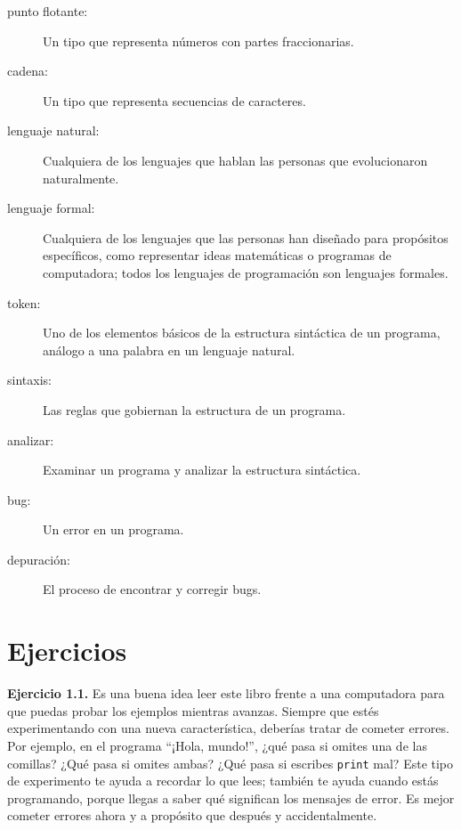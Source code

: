 \documentclass[12pt,letterpaper]{book}
\begin{document}
\begin{description}
\item[punto flotante:] Un tipo que representa números con partes fraccionarias.

\item[cadena:] Un tipo que representa secuencias de caracteres.

\item[lenguaje natural:] Cualquiera de los lenguajes que hablan las personas que evolucionaron naturalmente.

\item[lenguaje formal:] Cualquiera de los lenguajes que las personas han diseñado para propósitos específicos, como representar ideas matemáticas o programas de computadora; todos los lenguajes de programación son lenguajes formales.

\item[token:] Uno de los elementos básicos de la estructura sintáctica de un programa, análogo a una palabra en un lenguaje natural.

\item[sintaxis:] Las reglas que gobiernan la estructura de un programa.

\item[analizar:] Examinar un programa y analizar la estructura sintáctica.

\item[bug:] Un error en un programa.

\item[depuración:] El proceso de encontrar y corregir bugs.
\end{description}

\section{Ejercicios}

\textbf{Ejercicio 1.1.} Es una buena idea leer este libro frente a una computadora para que puedas probar los ejemplos mientras avanzas. Siempre que estés experimentando con una nueva característica, deberías tratar de cometer errores. Por ejemplo, en el programa ``¡Hola, mundo!'', ¿qué pasa si omites una de las comillas? ¿Qué pasa si omites ambas? ¿Qué pasa si escribes \texttt{print} mal? Este tipo de experimento te ayuda a recordar lo que lees; también te ayuda cuando estás programando, porque llegas a saber qué significan los mensajes de error. Es mejor cometer errores ahora y a propósito que después y accidentalmente.
\end{document}
